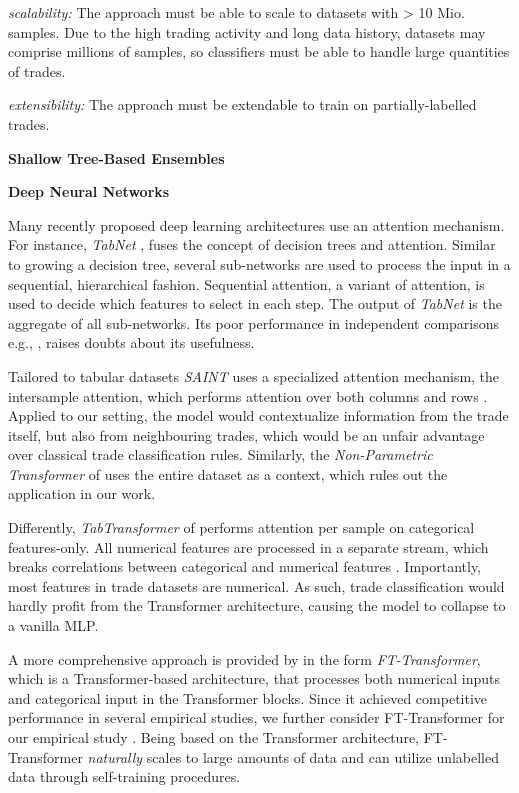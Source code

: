 \emph{scalability:}  The approach must be able to scale to datasets with > 10 Mio. samples. Due to the high trading activity and long data history, datasets may comprise millions of samples, so classifiers must be able to handle large quantities of trades.

\emph{extensibility:} The approach must be extendable to train on partially-labelled trades.

\textbf{Shallow Tree-Based Ensembles}


\textbf{Deep Neural Networks}

Many recently proposed deep learning architectures use an attention mechanism. For instance, \emph{TabNet} \autocite[][3--5]{arikTabnetAttentiveInterpretable2020}, fuses the concept of decision trees and attention. Similar to growing a decision tree, several sub-networks are used to process the input in a sequential, hierarchical fashion. Sequential attention, a variant of attention, is used to decide which features to select in each step. The output of \emph{TabNet} is the aggregate of all sub-networks. Its poor performance in independent comparisons e.g., \textcites[][7]{kadraWelltunedSimpleNets2021}[][7]{gorishniyRevisitingDeepLearning2021}, raises doubts about its usefulness. 

Tailored to tabular datasets \emph{SAINT} uses a specialized attention mechanism, the intersample attention, which performs attention over both columns and rows \autocite[][4--5]{somepalliSaintImprovedNeural2021}. Applied to our setting, the model would contextualize information from the trade itself, but also from neighbouring trades, which would be an unfair advantage over classical trade classification rules. Similarly, the \emph{Non-Parametric Transformer} of \textcite[][3--4]{kossenSelfAttentionDatapointsGoing2021} uses the entire dataset as a context, which rules out the application in our work. 

Differently, \emph{TabTransformer} of \textcite[][2--3]{huangTabTransformerTabularData2020} performs attention per sample on categorical features-only. All numerical features are processed in a separate stream, which breaks correlations between categorical and numerical features \autocite[][2]{somepalliSaintImprovedNeural2021}. Importantly, most features in trade datasets are numerical. As such, trade classification would hardly profit from the Transformer architecture, causing the model to collapse to a vanilla \gls{MLP}. 

A more comprehensive approach is provided by \textcite[][4--5]{gorishniyRevisitingDeepLearning2021} in the form \emph{FT-Transformer}, which is a Transformer-based architecture, that processes both numerical inputs and categorical input in the Transformer blocks. Since it achieved competitive performance in several empirical studies, we further consider FT-Transformer for our empirical study \autocite[][5]{grinsztajnWhyTreebasedModels2022}. Being based on the Transformer architecture, FT-Transformer \emph{naturally} scales to large amounts of data and can utilize unlabelled data through self-training procedures.

